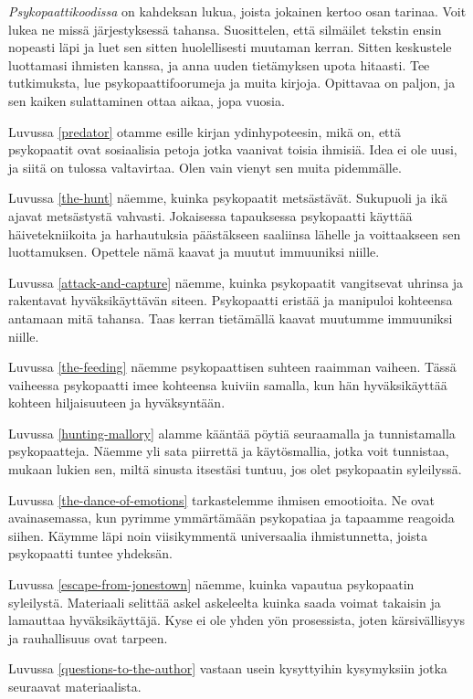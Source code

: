 \emph{Psykopaattikoodissa} on kahdeksan lukua, joista jokainen kertoo osan tarinaa. Voit lukea ne missä järjestyksessä tahansa. Suosittelen, että silmäilet tekstin ensin nopeasti läpi ja luet sen sitten huolellisesti muutaman kerran. Sitten keskustele luottamasi ihmisten kanssa, ja anna uuden tietämyksen upota hitaasti. Tee tutkimuksta, lue psykopaattifoorumeja ja muita kirjoja. Opittavaa on paljon, ja sen kaiken sulattaminen ottaa aikaa, jopa vuosia.

Luvussa \ref{predator} otamme esille kirjan ydinhypoteesin, mikä on, että psykopaatit ovat sosiaalisia petoja jotka vaanivat toisia ihmisiä. Idea ei ole uusi, ja siitä on tulossa valtavirtaa. Olen vain vienyt sen muita pidemmälle.

Luvussa \ref{the-hunt} näemme, kuinka psykopaatit metsästävät. Sukupuoli ja ikä ajavat metsästystä vahvasti. Jokaisessa tapauksessa psykopaatti käyttää häivetekniikoita ja harhautuksia päästäkseen saaliinsa lähelle ja voittaakseen sen luottamuksen. Opettele nämä kaavat ja muutut immuuniksi niille.

Luvussa \ref{attack-and-capture} näemme, kuinka psykopaatit vangitsevat uhrinsa ja rakentavat hyväksikäyttävän siteen. Psykopaatti eristää ja manipuloi kohteensa antamaan mitä tahansa. Taas kerran tietämällä kaavat muutumme immuuniksi niille.

Luvussa \ref{the-feeding} näemme psykopaattisen suhteen raaimman vaiheen. Tässä vaiheessa psykopaatti imee kohteensa kuiviin samalla, kun hän hyväksikäyttää kohteen hiljaisuuteen ja hyväksyntään.

Luvussa \ref{hunting-mallory} alamme kääntää pöytiä seuraamalla ja tunnistamalla psykopaatteja. Näemme yli sata piirrettä ja käytösmallia, jotka voit tunnistaa, mukaan lukien sen, miltä sinusta itsestäsi tuntuu, jos olet psykopaatin syleilyssä.

Luvussa \ref{the-dance-of-emotions} tarkastelemme ihmisen emootioita. Ne ovat avainasemassa, kun pyrimme ymmärtämään psykopatiaa ja tapaamme reagoida siihen. Käymme läpi noin viisikymmentä universaalia ihmistunnetta, joista psykopaatti tuntee yhdeksän.

Luvussa \ref{escape-from-jonestown} näemme, kuinka vapautua psykopaatin syleilystä. Materiaali selittää askel askeleelta kuinka saada voimat takaisin ja lamauttaa hyväksikäyttäjä. Kyse ei ole yhden yön prosessista, joten kärsivällisyys ja rauhallisuus ovat tarpeen.

Luvussa \ref{questions-to-the-author} vastaan usein kysyttyihin kysymyksiin jotka seuraavat materiaalista.

